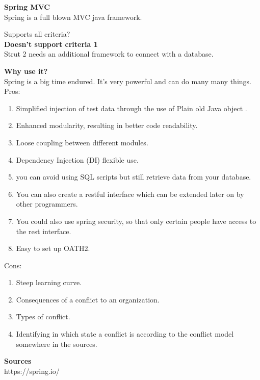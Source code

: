 \textbf{Spring MVC} \\
Spring is a full blown MVC java framework.

Supports all criteria? \\
\textbf{Doesn't support criteria 1}\\
Strut 2 needs an additional framework  to connect with a database.

\textbf{Why use it?}\\
Spring is a big time endured. It's very powerful and can do many many things.\\

Pros:
\begin{enumerate}
	\item Simplified injection of test data through the use of Plain old Java object .
	\item Enhanced modularity, resulting in better code readability.
	\item Loose coupling between different modules.
	\item Dependency Injection (DI) flexible use.
	\item you can avoid using SQL scripts but still retrieve data from your database.
	\item You can also create a restful interface which can be extended later on by other programmers.
	\item You could also use spring security, so that only certain people have access to the rest interface.
	\item Easy to set up OATH2. 
\end{enumerate}
Cons:
\begin{enumerate}
	\item Steep learning curve.
	\item Consequences of a conflict to an organization.
	\item Types of conflict.
	\item Identifying in which state a conflict is according to the conflict model somewhere in the sources.
\end{enumerate}

\textbf{Sources}\\
https://spring.io/